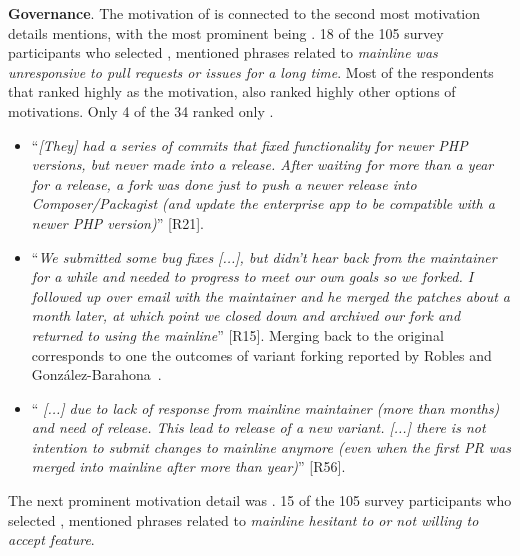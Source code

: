 \nd \textbf{Governance}. The motivation of  is connected to the second most motivation details mentions, with the most prominent being . 18 of the 105 survey participants who selected , mentioned phrases related to \emph{mainline was unresponsive to pull requests or issues for a long time}. Most of the respondents that ranked highly  as the motivation, also ranked highly other options of motivations. Only 4 of the 34 ranked only .


\begin{itemize}[leftmargin=*]
\item ``\emph{[They] %
had a series of commits that fixed functionality for newer PHP versions, but never made into a release. %
After waiting for more than a year for a release, a fork was done just to push a newer release into Composer/Packagist (and update the enterprise app to be compatible with a newer PHP version)}'' [R21].

\item ``\emph{We submitted some bug fixes [...], %
but didn't hear back from the maintainer for a while and needed to progress to meet our own goals so we forked. I followed up over email with the maintainer and he merged the patches about a month later, at which point we closed down and archived our fork and returned to using the mainline}'' [R15].
Merging back to the original corresponds to one the outcomes of variant forking reported by Robles and Gonz{\'a}lez-Barahona~\cite{Gregorio:2012}.

\item ``\emph{%
[...] due to lack of response from mainline maintainer (more than months) and need of release. This lead to release of a new variant. [...] there is not intention to submit changes to mainline anymore (even when the first PR was merged into mainline after more than year)}'' [R56].
\end{itemize}

\nd The next prominent  motivation detail was .
15 of the 105 survey participants who selected , mentioned phrases related to \emph{mainline hesitant to or not willing to accept feature}.

